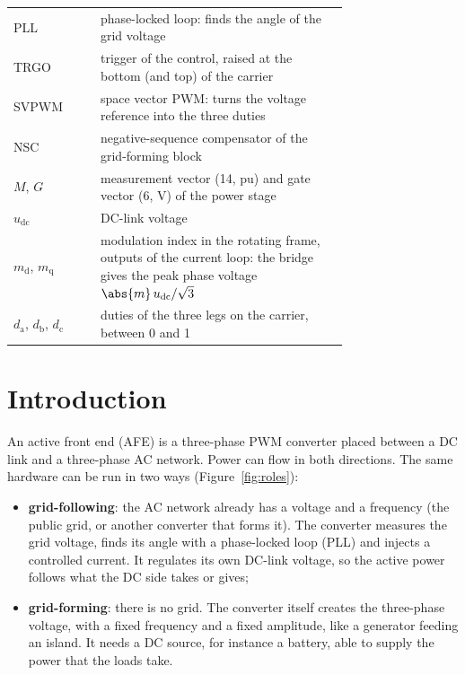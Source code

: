 \documentclass[11pt,a4paper]{scrartcl}
\newcommand{\ped}[1]{_{\mathrm{#1}}}
\begin{document}
\begin{onehalfspace}
\begin{longtable}{@{} l p{0.74\linewidth} @{}}
	PLL & phase-locked loop: finds the angle of the grid voltage \\
	TRGO & trigger of the control, raised at the bottom (and top) of the carrier \\
	SVPWM & space vector PWM: turns the voltage reference into the three duties \\
	NSC & negative-sequence compensator of the grid-forming block \\
	$M$, $G$ & measurement vector (14, pu) and gate vector (6, V) of the power stage \\
	$u\ped{dc}$ & DC-link voltage \\
	$m\ped{d}$, $m\ped{q}$ & modulation index in the rotating frame, outputs of the current loop: the bridge gives the peak phase voltage $\abs{m}\, u\ped{dc}/\sqrt{3}$ \\
	$d\ped{a}$, $d\ped{b}$, $d\ped{c}$ & duties of the three legs on the carrier, between 0 and 1 \\
\end{longtable}
\addtocounter{table}{-1}

\section{Introduction}
\label{sec:intro}

An active front end (AFE) is a three-phase PWM converter placed between a DC link and a three-phase AC network. Power can flow in both directions. The same hardware can be run in two ways (Figure~\ref{fig:roles}):

\begin{itemize}[nosep]
	\item \textbf{grid-following}: the AC network already has a voltage and a frequency (the public grid, or another converter that forms it). The converter measures the grid voltage, finds its angle with a phase-locked loop (PLL) and injects a controlled current. It regulates its own DC-link voltage, so the active power follows what the DC side takes or gives;
	\item \textbf{grid-forming}: there is no grid. The converter itself creates the three-phase voltage, with a fixed frequency and a fixed amplitude, like a generator feeding an island. It needs a DC source, for instance a battery, able to supply the power that the loads take.
\end{itemize}


\end{onehalfspace}
\end{document}
